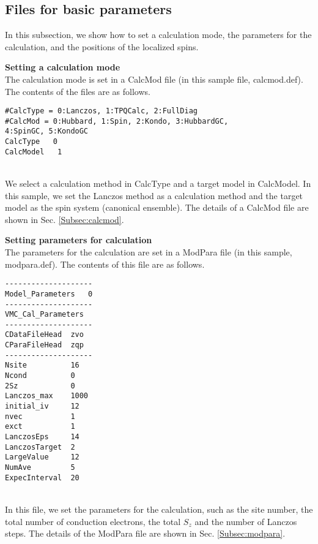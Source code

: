 \subsection{Files for basic parameters}
In this subsection, we show how to set a calculation mode,
the parameters for the calculation, and the positions of the localized spins.
\begin{description}
\item {\bf Setting a calculation mode}\\
  The calculation mode is set in a CalcMod file (in this sample file, calcmod.def).
  The contents of the files are as follows.\\
\begin{minipage}{15cm}
\begin{screen}
\begin{verbatim}
#CalcType = 0:Lanczos, 1:TPQCalc, 2:FullDiag
#CalcMod = 0:Hubbard, 1:Spin, 2:Kondo, 3:HubbardGC, 
4:SpinGC, 5:KondoGC 
CalcType   0
CalcModel   1
\end{verbatim}
\end{screen}
\end{minipage}
~\\
We select a calculation method in CalcType and a target model in CalcModel.
In this sample, we set the Lanczos method as a calculation method
and the target model as the spin system (canonical ensemble).
The details of a CalcMod file are shown in Sec. \ref{Subsec:calcmod}.\\

\item {\bf Setting parameters for calculation}\\
  The parameters for the calculation are set in a ModPara file
  (in this sample, modpara.def).
  The contents of this file are as follows.\\
\begin{minipage}{15cm}
\begin{screen}
\begin{verbatim}
--------------------
Model_Parameters   0
--------------------
VMC_Cal_Parameters
--------------------
CDataFileHead  zvo
CParaFileHead  zqp
--------------------
Nsite          16   
Ncond          0    
2Sz            0    
Lanczos_max    1000 
initial_iv     12   
nvec           1    
exct           1    
LanczosEps     14   
LanczosTarget  2    
LargeValue     12   
NumAve         5    
ExpecInterval  20 
\end{verbatim}
\end{screen}
\end{minipage}
~\\
In this file, we set the parameters for the calculation, such as the site number,
the total number of conduction electrons, the total $S_z$ and the number of Lanczos steps.
The details of the ModPara file are shown in Sec. \ref{Subsec:modpara}.\\


\end{description}
